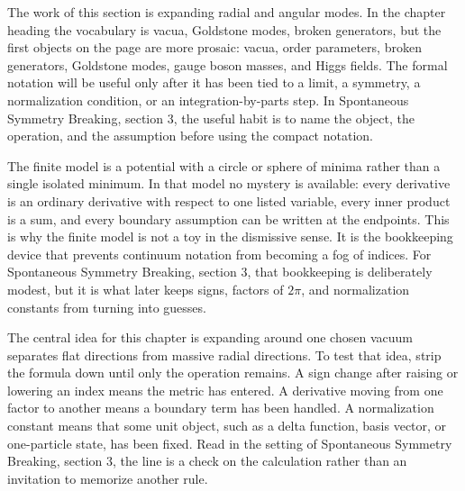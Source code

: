 











The work of this section is expanding radial and angular modes.  In the chapter heading the vocabulary is vacua, Goldstone modes, broken generators, but the first objects on the page are more prosaic: vacua, order parameters, broken generators, Goldstone modes, gauge boson masses, and Higgs fields.  The formal notation will be useful only after it has been tied to a limit, a symmetry, a normalization condition, or an integration-by-parts step.  In Spontaneous Symmetry Breaking, section 3, the useful habit is to name the object, the operation, and the assumption before using the compact notation.

The finite model is a potential with a circle or sphere of minima rather than a single isolated minimum.  In that model no mystery is available: every derivative is an ordinary derivative with respect to one listed variable, every inner product is a sum, and every boundary assumption can be written at the endpoints.  This is why the finite model is not a toy in the dismissive sense.  It is the bookkeeping device that prevents continuum notation from becoming a fog of indices.  For Spontaneous Symmetry Breaking, section 3, that bookkeeping is deliberately modest, but it is what later keeps signs, factors of \(2\pi\), and normalization constants from turning into guesses.

The central idea for this chapter is expanding around one chosen vacuum separates flat directions from massive radial directions.  To test that idea, strip the formula down until only the operation remains.  A sign change after raising or lowering an index means the metric has entered.  A derivative moving from one factor to another means a boundary term has been handled.  A normalization constant means that some unit object, such as a delta function, basis vector, or one-particle state, has been fixed.  Read in the setting of Spontaneous Symmetry Breaking, section 3, the line is a check on the calculation rather than an invitation to memorize another rule.


